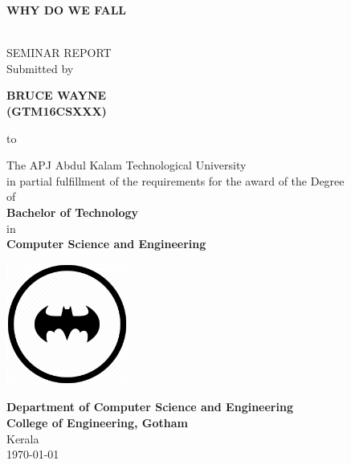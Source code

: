 \begin{titlepage}

\begin{center}


\begin{Large}{\textbf {WHY DO WE FALL}}\end{Large}\\[1.0cm]

 \textup{\large SEMINAR REPORT}\\[1.0cm]

\textup{\large{Submitted by}}

\vfill

\begin{large} \textbf{BRUCE WAYNE} \\
	                \textbf {(GTM16CSXXX)} \\ 
\end{large}

\vfill 

\textup{\large{to }}

\vfill


\textup{\normalsize {The APJ Abdul Kalam Technological University \\ in partial fulfillment of the requirements for the award of the Degree \\ of \\\textbf{ Bachelor of Technology} \\ in \\ \textbf{Computer Science and Engineering}}}

\vfill

\includegraphics[width = 40mm]{logo.png}

\vfill 


\textbf{Department of Computer Science and Engineering
}\\
\normalsize
\textbf{College of Engineering, Gotham}\\
Kerala\\
\today
\vspace{0.5cm}

\end{center}

\end{titlepage}
\vspace{1.5in}
\linespread{}